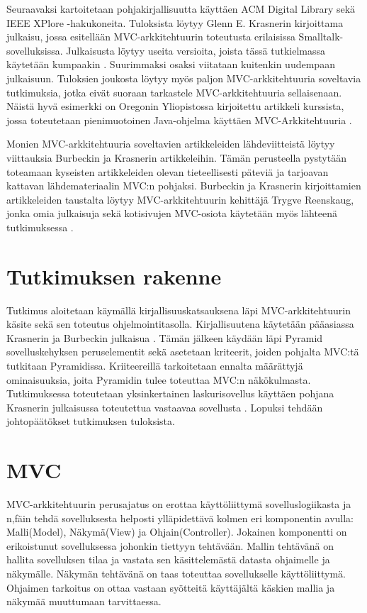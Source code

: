 \documentclass[finnish,utf8,nonumbib,palatino,kandi]{gradu2}
\begin{document}
Seuraavaksi kartoitetaan pohjakirjallisuutta käyttäen ACM Digital Library sekä IEEE XPlore -hakukoneita. Tuloksista löytyy Glenn E.
Krasnerin kirjoittama julkaisu, jossa esitellään MVC-arkkitehtuurin toteutusta erilaisissa Smalltalk-sovelluksissa. Julkaisusta löytyy useita versioita, joista tässä tutkielmassa käytetään kumpaakin \cite{Krasner} \cite{Krasner:desc}.  Suurimmaksi osaksi viitataan kuitenkin uudempaan julkaisuun. Tuloksien joukosta
löytyy myös paljon MVC-arkkitehtuuria soveltavia tutkimuksia, jotka eivät suoraan tarkastele MVC-arkkitehtuuria sellaisenaan. Näistä hyvä esimerkki on
Oregonin Yliopistossa kirjoitettu artikkeli kurssista, jossa toteutetaan pienimuotoinen Java-ohjelma käyttäen MVC-Arkkitehtuuria \cite{Morse}.

Monien MVC-arkkitehtuuria soveltavien artikkeleiden lähdeviitteistä löytyy viittauksia Burbeckin ja Krasnerin artikkeleihin. Tämän perusteella pystytään
toteamaan kyseisten artikkeleiden olevan tieteellisesti päteviä ja tarjoavan kattavan lähdemateriaalin MVC:n pohjaksi. Burbeckin ja Krasnerin kirjoittamien artikkeleiden taustalta löytyy
MVC-arkkitehtuurin kehittäjä Trygve Reenskaug, jonka omia julkaisuja sekä kotisivujen MVC-osiota
käytetään myös lähteenä tutkimuksessa \cite{Reenskaug}.

\section {Tutkimuksen rakenne}
Tutkimus aloitetaan käymällä kirjallisuuskatsauksena läpi MVC-arkkitehtuurin käsite sekä sen toteutus ohjelmointitasolla. Kirjallisuutena käytetään
pääasiassa Krasnerin ja Burbeckin julkaisua \cite{Krasner:desc, Burbeck}. Tämän jälkeen käydään läpi Pyramid sovelluskehyksen peruselementit sekä asetetaan
kriteerit, joiden pohjalta MVC:tä tutkitaan Pyramidissa. Kriiteereillä tarkoitetaan ennalta määrättyjä ominaisuuksia, joita Pyramidin tulee toteuttaa MVC:n näkökulmasta.  Tutkimuksessa toteutetaan yksinkertainen laskurisovellus käyttäen pohjana
Krasnerin julkaisussa toteutettua vastaavaa sovellusta \cite{Krasner:desc}. Lopuksi tehdään johtopäätökset tutkimuksen tuloksista.


\section {MVC}
MVC-arkkitehtuurin perusajatus on erottaa käyttöliittymä sovelluslogiikasta ja
n,fäin tehdä sovelluksesta helposti ylläpidettävä kolmen eri komponentin avulla:
Malli(Model), Näkymä(View) ja Ohjain(Controller). Jokainen komponentti on
erikoistunut sovelluksessa johonkin tiettyyn tehtävään. Mallin tehtävänä on
hallita sovelluksen tilaa ja vastata sen käsittelemästä datasta ohjaimelle ja näkymälle.
Näkymän tehtävänä on taas toteuttaa sovellukselle käyttöliittymä. Ohjaimen tarkoitus on ottaa
vastaan syötteitä käyttäjältä käskien mallia ja näkymää muuttumaan tarvittaessa.
\end{document}
